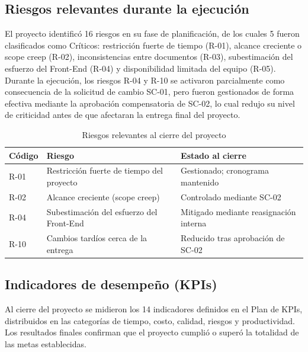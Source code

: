 \documentclass[11pt,spanish]{article}
\begin{document}
\subsection{Riesgos relevantes durante la ejecución}

El proyecto identificó 16 riesgos en su fase de planificación, de los cuales 5 fueron clasificados como Críticos: restricción fuerte de tiempo (R-01), alcance creciente o scope creep (R-02), inconsistencias entre documentos (R-03), subestimación del esfuerzo del Front-End (R-04) y disponibilidad limitada del equipo (R-05).\\
Durante la ejecución, los riesgos R-04 y R-10 se activaron parcialmente como consecuencia de la solicitud de cambio SC-01, pero fueron gestionados de forma efectiva mediante la aprobación compensatoria de SC-02, lo cual redujo su nivel de criticidad antes de que afectaran la entrega final del proyecto.


\begin{table}[H]
\centering
\caption{Riesgos relevantes al cierre del proyecto}
\label{tab:riesgos}
\begin{tabularx}{\textwidth}{p{1.5cm}Yp{4cm}}
\toprule
\textbf{Código} &
\textbf{Riesgo} &
\textbf{Estado al cierre} \\
\midrule

R-01 &
Restricción fuerte de tiempo del proyecto &
Gestionado; cronograma mantenido
\\

R-02 &
Alcance creciente (scope creep) &
Controlado mediante SC-02
\\

R-04 &
Subestimación del esfuerzo del Front-End &
Mitigado mediante reasignación interna
\\

R-10 &
Cambios tardíos cerca de la entrega &
Reducido tras aprobación de SC-02
\\

\bottomrule
\end{tabularx}
\end{table}

\subsection{Indicadores de desempeño (KPIs)}

Al cierre del proyecto se midieron los 14 indicadores definidos en el Plan de KPIs, distribuidos en las categorías de tiempo, costo, calidad, riesgos y productividad. Los resultados finales confirman que el proyecto cumplió o superó la totalidad de las metas establecidas.
\end{document}
